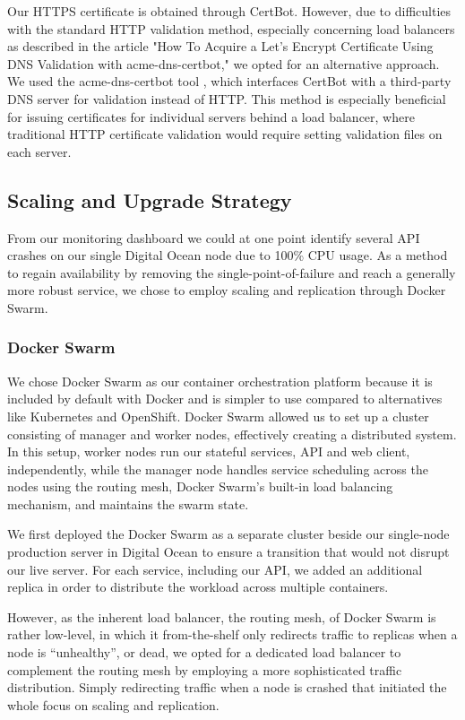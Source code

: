 Our HTTPS certificate is obtained through CertBot. However, due to difficulties with the standard HTTP validation method, especially concerning load balancers as described in the article "How To Acquire a Let's Encrypt Certificate Using DNS Validation with acme-dns-certbot," \cite{certbotDigitalOceanIssues} we opted for an alternative approach. We used the acme-dns-certbot tool \cite{acmedns}, which interfaces CertBot with a third-party DNS server for validation instead of HTTP. This method is especially beneficial for issuing certificates for individual servers behind a load balancer, where traditional HTTP certificate validation would require setting validation files on each server.

\subsection{Scaling and Upgrade Strategy}
From our monitoring dashboard we could at one point identify several API crashes on our single Digital Ocean node due to 100\% CPU usage. As a method to regain availability by removing the single-point-of-failure and reach a generally more robust service, we chose to employ scaling and replication through Docker Swarm.

\subsubsection*{Docker Swarm}
We chose Docker Swarm as our container orchestration platform because it is included by default with Docker and is simpler to use compared to alternatives like Kubernetes and OpenShift. Docker Swarm allowed us to set up a cluster consisting of manager and worker nodes, effectively creating a distributed system. In this setup, worker nodes run our stateful services, API and web client, independently, while the manager node handles service scheduling across the nodes using the routing mesh, Docker Swarm's built-in load balancing mechanism, and maintains the swarm state.

We first deployed the Docker Swarm as a separate cluster beside our single-node production server in Digital Ocean to ensure a transition that would not disrupt our live server. For each service, including our API, we added an additional replica in order to distribute the workload across multiple containers.

However, as the inherent load balancer, the routing mesh, of Docker Swarm is rather low-level, in which it from-the-shelf only redirects traffic to replicas when a node is “unhealthy”, or dead, we opted for a dedicated load balancer to complement the routing mesh by employing a more sophisticated traffic distribution. Simply redirecting traffic when a node is crashed  that initiated the whole focus on scaling and replication.


